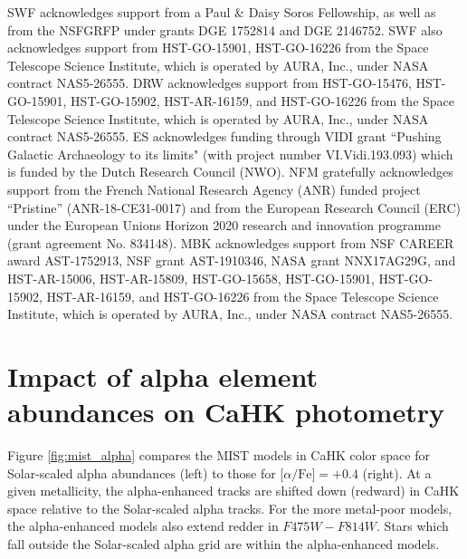 \documentclass[twocolumn]{aastex63}
\begin{document}
\par SWF acknowledges support from a Paul \& Daisy Soros Fellowship, as well as from the NSFGRFP under grants DGE 1752814 and DGE 2146752. SWF also acknowledges support from HST-GO-15901, HST-GO-16226 from the Space Telescope Science Institute, which is operated by AURA, Inc., under NASA contract NAS5-26555. DRW acknowledges support from HST-GO-15476, HST-GO-15901, HST-GO-15902, HST-AR-16159, and HST-GO-16226 from the Space Telescope Science Institute, which is operated by AURA, Inc., under NASA contract NAS5-26555. ES acknowledges funding through VIDI grant ``Pushing Galactic Archaeology to its limits" (with project number VI.Vidi.193.093) which is funded by the Dutch Research Council (NWO). NFM gratefully acknowledges support from the French National Research Agency (ANR) funded project ``Pristine'' (ANR-18-CE31-0017) and from the European Research Council (ERC) under the European Unions Horizon 2020 research and innovation programme (grant agreement No. 834148). MBK acknowledges support from NSF CAREER award AST-1752913, NSF grant AST-1910346, NASA grant NNX17AG29G, and HST-AR-15006, HST-AR-15809, HST-GO-15658, HST-GO-15901, HST-GO-15902, HST-AR-16159, and HST-GO-16226 from the Space Telescope Science Institute, which is operated by AURA, Inc., under NASA contract NAS5-26555. 


{}


\appendix

\section{Impact of alpha element abundances on CaHK photometry}
\label{sec:appendix_alphaeffect}

\par Figure \ref{fig:mist_alpha} compares the MIST models in CaHK color space for Solar-scaled alpha abundances (left) to those for [$\alpha\mbox{/Fe]}=+0.4$ (right). At a given metallicity, the alpha-enhanced tracks are shifted down (redward) in CaHK space relative to the Solar-scaled alpha tracks. For the more metal-poor models, the alpha-enhanced models also extend redder in $F475W-F814W$. Stars which fall outside the Solar-scaled alpha grid are within the alpha-enhanced models. 
\end{document}
